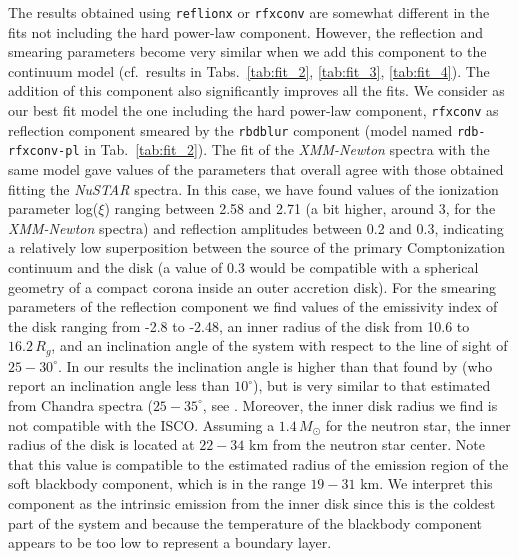 \documentclass{aa}
\begin{document}
The results obtained using \texttt{reflionx} or \texttt{rfxconv} are
somewhat different in the fits not including the hard power-law component.
However, the reflection and smearing parameters become very similar 
when we add this component to the continuum model (cf.\ results in Tabs.\
\ref{tab:fit_2}, \ref{tab:fit_3}, \ref{tab:fit_4}). The addition of 
this component also significantly improves all the fits. 
We consider as our best fit model the one including the hard power-law
component, \texttt{rfxconv} as reflection component smeared by the 
\texttt{rbdblur} component (model named \texttt{rdb-rfxconv-pl} in Tab.\ 
\ref{tab:fit_2}). The fit of the \emph{XMM-Newton} spectra with the same
model gave values of the parameters that overall agree with those obtained
fitting the \emph{NuSTAR} spectra. In this case, we have found values of 
the ionization parameter log($\xi$) ranging between 2.58 and 2.71 (a bit 
higher, around 3, for the \emph{XMM-Newton} spectra) and reflection 
amplitudes between 0.2 and 0.3, indicating a relatively low superposition 
between the source of the primary Comptonization continuum and the disk 
(a value of 0.3 would be compatible with a spherical geometry of a compact 
corona inside an outer accretion disk). For the smearing parameters of the
reflection component we find values of the emissivity index of the disk 
ranging from -2.8 to -2.48, an inner radius of the disk from 10.6 to 
$16.2 \, R_g$, and an inclination angle of the system with respect to the 
line of sight of $25-30^\circ$. In our results the inclination angle is 
higher than that found by \citet{Miller.etal:13} (who report an inclination 
angle less than $10^\circ$), but is very similar to that estimated from
Chandra spectra ($25-35^\circ$, see  \cite{Chiang.etal:16}. 
Moreover, the inner disk radius we find is not compatible with the ISCO. 
Assuming a $1.4 \, M_\odot$ for the neutron star, the inner radius of the 
disk is located at $22-34$ km from the neutron star center. Note that this 
value is compatible to the estimated radius of the emission region of the 
soft blackbody component, which is in the range $19-31$ km. We 
interpret this component as the intrinsic emission from the inner disk since
this is the coldest part of the system and because %
the temperature of the blackbody component appears to be too low to represent 
a boundary layer. \\


\end{document}
